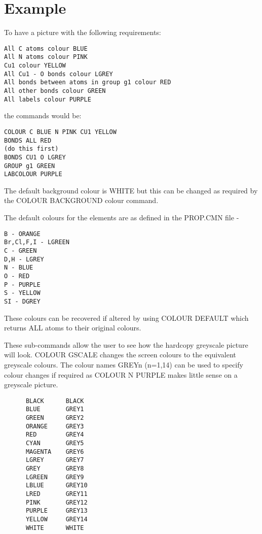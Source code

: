 \documentclass[10pt,a4paper]{report}
\begin{document}
\section{Example}


To have a picture with the following requirements:

\small\begin{verbatim}
All C atoms colour BLUE
All N atoms colour PINK
Cu1 colour YELLOW
All Cu1 - O bonds colour LGREY
All bonds between atoms in group g1 colour RED
All other bonds colour GREEN
All labels colour PURPLE
\end{verbatim}\normalsize




the commands would be:

\small\begin{verbatim}
COLOUR C BLUE N PINK CU1 YELLOW
BONDS ALL RED
(do this first)
BONDS CU1 O LGREY
GROUP g1 GREEN
LABCOLOUR PURPLE
\end{verbatim}\normalsize




\bigskip{}


The default background colour is WHITE but this can be changed as 
required by the COLOUR BACKGROUND colour command.


\bigskip{}


The default colours for the elements are as defined in the PROP.CMN 
file -
\small\begin{verbatim}
B - ORANGE
Br,Cl,F,I - LGREEN
C - GREEN
D,H - LGREY
N - BLUE
O - RED
P - PURPLE
S - YELLOW
SI - DGREY
\end{verbatim}\normalsize


These colours can be recovered if altered by using COLOUR DEFAULT which 
returns ALL atoms to their original colours.


\bigskip{}


\bigskip{}


These sub-commands allow the user to see how the hardcopy greyscale
picture will look. COLOUR GSCALE changes the screen colours to the
equivalent greyscale colours. The colour names GREYn (n=1,14) can be
used to specify colour changes if required as COLOUR N PURPLE makes
little sense on a greyscale picture.

\small\begin{verbatim}
      BLACK      BLACK
      BLUE       GREY1
      GREEN      GREY2
      ORANGE     GREY3
      RED        GREY4
      CYAN       GREY5
      MAGENTA    GREY6
      LGREY      GREY7
      GREY       GREY8
      LGREEN     GREY9
      LBLUE      GREY10
      LRED       GREY11
      PINK       GREY12
      PURPLE     GREY13
      YELLOW     GREY14
      WHITE      WHITE
\end{verbatim}\normalsize
\end{document}
